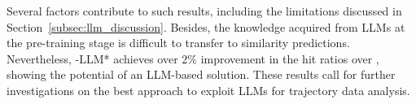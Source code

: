 Several factors contribute to such results, including the limitations discussed in Section~\ref{subsec:llm_discussion}. Besides, the knowledge acquired from LLMs at the pre-training stage is difficult to transfer to similarity predictions. 
Nevertheless, \model-LLM* achieves over 2\% improvement in the hit ratios over \model, showing the potential of an LLM-based solution. 
These results call for further investigations on the best approach to exploit LLMs for trajectory data analysis. 

